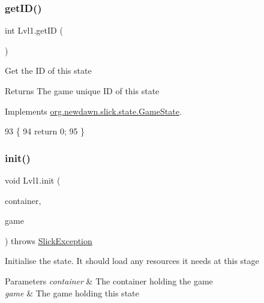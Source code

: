\subsubsection{\texorpdfstring{get\+I\+D()}{getID()}}
{\footnotesize\ttfamily int Lvl1.\+get\+ID (\begin{DoxyParamCaption}{ }\end{DoxyParamCaption})\hspace{0.3cm}{\ttfamily [inline]}}

Get the ID of this state

\begin{DoxyReturn}{Returns}
The game unique ID of this state 
\end{DoxyReturn}


Implements \mbox{\hyperlink{interfaceorg_1_1newdawn_1_1slick_1_1state_1_1_game_state_a54f2bc6a91feaf0614a5ef19f1d03313}{org.\+newdawn.\+slick.\+state.\+Game\+State}}.


\begin{DoxyCode}
93                        \{
94         \textcolor{keywordflow}{return} 0;
95     \}
\end{DoxyCode}
\mbox{\label{class_lvl1_a4b928f9625e0441dae8ed54bfdf479cc}} 
\subsubsection{\texorpdfstring{init()}{init()}}
{\footnotesize\ttfamily void Lvl1.\+init (\begin{DoxyParamCaption}\item[{\mbox{\hyperlink{classorg_1_1newdawn_1_1slick_1_1_game_container}{Game\+Container}}}]{container,  }\item[{\mbox{\hyperlink{classorg_1_1newdawn_1_1slick_1_1state_1_1_state_based_game}{State\+Based\+Game}}}]{game }\end{DoxyParamCaption}) throws \mbox{\hyperlink{classorg_1_1newdawn_1_1slick_1_1_slick_exception}{Slick\+Exception}}\hspace{0.3cm}{\ttfamily [inline]}}

Initialise the state. It should load any resources it needs at this stage


\begin{DoxyParams}{Parameters}
{\em container} & The container holding the game \\
\hline
{\em game} & The game holding this state \\
\hline
\end{DoxyParams}

